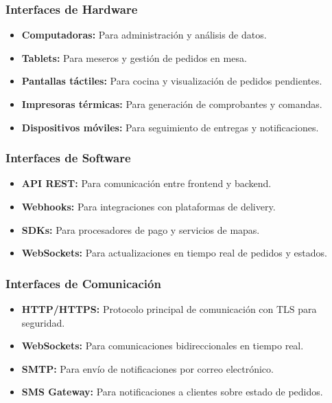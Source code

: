 \documentclass[12pt]{article}
\begin{document}
\subsubsection{Interfaces de Hardware}
\begin{itemize}
  \item \textbf{Computadoras:} Para administración y análisis de datos.
  \item \textbf{Tablets:} Para meseros y gestión de pedidos en mesa.
  \item \textbf{Pantallas táctiles:} Para cocina y visualización de pedidos pendientes.
  \item \textbf{Impresoras térmicas:} Para generación de comprobantes y comandas.
  \item \textbf{Dispositivos móviles:} Para seguimiento de entregas y notificaciones.
\end{itemize}

\subsubsection{Interfaces de Software}
\begin{itemize}
  \item \textbf{API REST:} Para comunicación entre frontend y backend.
  \item \textbf{Webhooks:} Para integraciones con plataformas de delivery.
  \item \textbf{SDKs:} Para procesadores de pago y servicios de mapas.
  \item \textbf{WebSockets:} Para actualizaciones en tiempo real de pedidos y estados.
\end{itemize}

\subsubsection{Interfaces de Comunicación}
\begin{itemize}
  \item \textbf{HTTP/HTTPS:} Protocolo principal de comunicación con TLS para seguridad.
  \item \textbf{WebSockets:} Para comunicaciones bidireccionales en tiempo real.
  \item \textbf{SMTP:} Para envío de notificaciones por correo electrónico.
  \item \textbf{SMS Gateway:} Para notificaciones a clientes sobre estado de pedidos.
\end{itemize}
\end{document}
